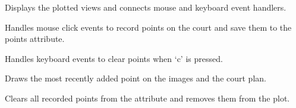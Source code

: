 \documentclass[letterpaper,10pt,english]{sphinxmanual}
\begin{document}
\begin{fulllineitems}
\begin{fulllineitems}
\end{fulllineitems}


\begin{fulllineitems}
\label{\detokenize{CameraUtils:CameraUtils.PlotCameras.ShowViews}}
\pysigstartsignatures
{}
\pysigstopsignatures
\sphinxAtStartPar
Displays the plotted views and connects mouse and keyboard event handlers.

\end{fulllineitems}


\begin{fulllineitems}
\label{\detokenize{CameraUtils:CameraUtils.PlotCameras._on_click}}
\pysigstartsignatures
{}
\pysigstopsignatures
\sphinxAtStartPar
Handles mouse click events to record points on the court and save them to the points attribute.

\end{fulllineitems}



\begin{fulllineitems}

\pysigstartsignatures
{}
\pysigstopsignatures
\sphinxAtStartPar
Handles keyboard events to clear points when ‘c’ is pressed.

\end{fulllineitems}



\begin{fulllineitems}

\pysigstartsignatures
{}
\pysigstopsignatures
\sphinxAtStartPar
Draws the most recently added point on the images and the court plan.

\end{fulllineitems}



\begin{fulllineitems}

\pysigstartsignatures
{}
\pysigstopsignatures
\sphinxAtStartPar
Clears all recorded points from the  attribute and removes them from the plot.


\end{fulllineitems}
\end{fulllineitems}
\end{document}
